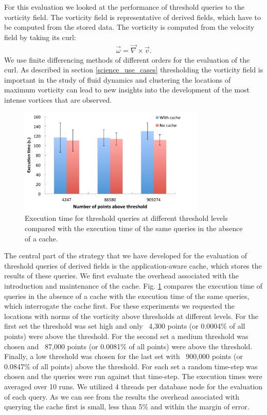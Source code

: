 \documentclass{sig-alternate}
\newcommand{\kk}[1]{{\color{blue}{\it KK: #1}}}
\begin{document}
For this evaluation we looked at the performance of threshold queries to the vorticity field. The vorticity field is representative of derived fields, which
have to be computed from the stored data. The vorticity is computed from the velocity field by taking its curl:
\begin{align}
\vec{\omega} = \vec{\nabla} \times \vec{v}.
\label{eq:curl}
\end{align}
We use finite differencing methods of
different orders for the evaluation of the curl. As described in section \ref{science_use_cases}
thresholding the vorticity field is important in the study of fluid dynamics and clustering the locations of maximum vorticity can lead to new insights into
the development of the most intense vortices that are observed. \kk{Consider showing other fields as well; possibly thresholding the velocity by itself}

\begin{figure}
\centering
\includegraphics[width=3.5in]{Figures/cache_overhead.pdf}
\caption{Execution time for threshold queries at different threshold levels compared with the execution time of the same queries in the absence of a cache.}
\label{fig:cache_overhead}
\end{figure}

The central part of the strategy that we have developed for the evaluation of threshold queries of derived fields is the application-aware cache, which
stores the results of these queries. We first evaluate the overhead associated with the introduction and maintenance of the cache. Fig. \ref{fig:cache_overhead}
compares the execution time of queries in the absence of a cache with the execution time of the same queries, which interrogate the cache first.
For these experiments we requested
the locations with norms of the vorticity above thresholds at different levels. For the first set the threshold was set high and only ~4,300 points (or 0.0004\%
of all points) were above the threshold. For the second set a medium threshold was chosen and ~87,000 points (or 0.0081\% of all points) were above the
threshold. Finally, a low threshold was chosen for the last set with ~900,000 points (or 0.0847\% of all points) above the threshold. For each set a random
time-step was chosen and the queries were run against that time-step. The execution times were averaged over 10 runs. We utilized 4 threads per database
node for the evaluation of each query. As we can see from the results the overhead associated with querying the cache first is small, less than 5\% and within
the margin of error.
\kk{Consider including a figure for a representative time-step showing the PDF of the vorticity field
to show how the vorticity values are distributed and to get an understanding for the different threshold levels.}
\end{document}
